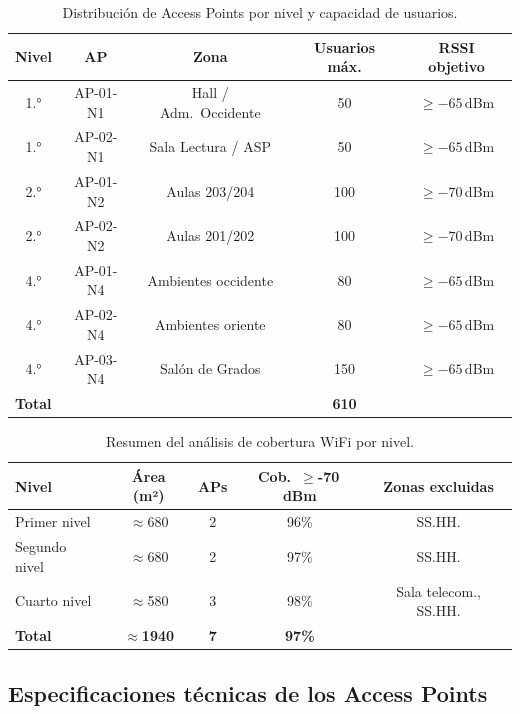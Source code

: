 \begin{table}[H]
    \centering
    \caption{Distribución de Access Points por nivel y capacidad de usuarios.}
    \label{tab:distribucion_ap}
    \begin{tabular}{|c|c|c|c|c|}
        \hline
        \textbf{Nivel} & \textbf{AP} & \textbf{Zona} &
        \textbf{Usuarios máx.} & \textbf{RSSI objetivo} \\
        \hline
        1.° & AP-01-N1 & Hall / Adm.\ Occidente  &  50 & $\geq -65$\,dBm \\
        1.° & AP-02-N1 & Sala Lectura / ASP       &  50 & $\geq -65$\,dBm \\
        2.° & AP-01-N2 & Aulas 203/204            & 100 & $\geq -70$\,dBm \\
        2.° & AP-02-N2 & Aulas 201/202            & 100 & $\geq -70$\,dBm \\
        4.° & AP-01-N4 & Ambientes occidente      &  80 & $\geq -65$\,dBm \\
        4.° & AP-02-N4 & Ambientes oriente        &  80 & $\geq -65$\,dBm \\
        4.° & AP-03-N4 & Salón de Grados          & 150 & $\geq -65$\,dBm \\
        \hline
        \multicolumn{3}{|l|}{\textbf{Total}} & \textbf{610} & \\
        \hline
    \end{tabular}
\end{table}%
\begin{table}[H]
    \centering
    \caption{Resumen del análisis de cobertura WiFi por nivel.}
    \label{tab:cobertura_nivel}
    \begin{tabular}{|l|c|c|c|c|}
        \hline
        \textbf{Nivel} & \textbf{Área (m²)} & \textbf{APs} &
        \textbf{Cob.\ $\geq$-70\,dBm} & \textbf{Zonas excluidas} \\
        \hline
        Primer nivel  & $\approx$680  & 2 & 96\% & SS.HH. \\
        Segundo nivel & $\approx$680  & 2 & 97\% & SS.HH. \\
        Cuarto nivel  & $\approx$580  & 3 & 98\% & Sala telecom., SS.HH. \\
        \hline
        \textbf{Total} & $\approx$\textbf{1940} & \textbf{7} & \textbf{97\%} & \\
        \hline
    \end{tabular}
\end{table}
\subsection{Especificaciones técnicas de los Access Points}

